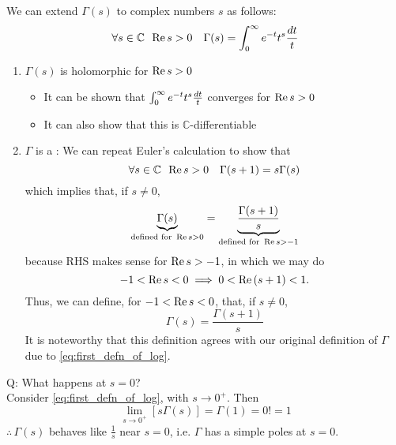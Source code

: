\documentclass[11pt, oneside]{book}
\begin{document}
We can extend $\Gamma(s)$ to complex numbers $s$ as follows:
\begin{equation*}
  \forall s \in \mathbb{C} \enspace \operatorname{Re}{s} > 0 \quad \Gamma(s) = \int_{0}^{\infty} e^{-t} t^s \frac{\mathop{}\!d{t}}{t}
\end{equation*}

\begin{note}
  \begin{enumerate}
    \item $\Gamma(s)$ is holomorphic for $\operatorname{Re}{s} > 0$
    \begin{itemize}
      \item It can be shown that $\int_{0}^{\infty} e^{- t} t^s \frac{\mathop{}\!d{t}}{t}$ converges for $\operatorname{Re}{s} > 0$
      \item It can also show that this is $\mathbb{C}$-differentiable
    \end{itemize}

    \item $\Gamma$ is a : We can repeat Euler's calculation to show that
    \begin{equation*}
      \forall s \in \mathbb{C} \enspace \operatorname{Re}{s} > 0 \quad \Gamma(s + 1) = s \Gamma(s)
    \end{equation*}
    which implies that, if $s \neq 0$,
    \begin{equation*}
      \underbrace{\Gamma(s)}_{\text{defined for } \operatorname{Re}{s} > 0} = \underbrace{\frac{\Gamma(s + 1)}{s}}_{\text{defined for } \operatorname{Re}{s} > -1}
    \end{equation*}
    because RHS makes sense for $\operatorname{Re}{s} > -1$, in which we may do
    \begin{equation*}
      -1 < \operatorname{Re}{s} < 0 \implies 0 < \operatorname{Re}{(s + 1)} < 1.
    \end{equation*}
    Thus, we can define, for $-1 < \operatorname{Re}{s} < 0$, that, if $s \neq 0$,
    \begin{equation*}
      \Gamma(s) = \frac{\Gamma(s + 1)}{s}
    \end{equation*}
    It is noteworthy that this definition agrees with our original definition of $\Gamma$ due to \cref{eq:first_defn_of_log}.
  \end{enumerate}
\end{note}

Q: What happens at $s = 0$? \\
Consider \cref{eq:first_defn_of_log}, with $s \to 0^+$. Then
\begin{equation*}
  \lim_{s \to 0^+} \left[ s \Gamma(s) \right] = \Gamma(1) = 0! = 1
\end{equation*}
$\therefore \, \Gamma(s)$ behaves like $\frac{1}{s}$ near $s = 0$, i.e. $\Gamma$ has a simple poles at $s = 0$.
\end{document}
